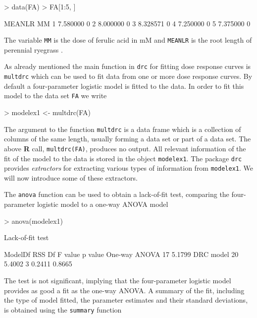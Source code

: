 \documentclass[a4paper]{article}
\begin{document}
\begin{Schunk}
\begin{Sinput}
> data(FA)
> FA[1:5, ]
\end{Sinput}
\begin{Soutput}
    MEANLR MM
1 7.580000  0
2 8.000000  0
3 8.328571  0
4 7.250000  0
5 7.375000  0
\end{Soutput}
\end{Schunk}
The variable \verb+MM+ is the dose of ferulic acid in mM and \verb+MEANLR+ is the root length of perennial ryegrass 
\citep{inderjit&streibig&olofsdotter:2002}.

As already mentioned the main function in \verb+drc+ for fitting dose response curves is \verb+multdrc+ which can be used to fit data from one or 
more dose response curves.
By default a four-parameter logistic model is fitted to the data. In order to fit this model to 
the data set \verb+FA+ we write 

\begin{Schunk}
\begin{Sinput}
> modelex1 <- multdrc(FA)
\end{Sinput}
\end{Schunk}
The argument to the function \verb+multdrc+ is a data frame 
which is a collection of columns of the same length, usually forming a data set or part of 
a data set. The above \textbf{R} call, \verb+multdrc(FA)+, produces no output. All relevant information of the fit of the model
to the data is stored in the object \verb+modelex1+. The package \verb+drc+ provides \emph{extractors} for extracting
various types of information from \verb+modelex1+. We will now introduce some of these extractors.

The \verb+anova+ function can be used to obtain a lack-of-fit test, comparing the four-parameter logistic model to a one-way ANOVA model

\begin{Schunk}
\begin{Sinput}
> anova(modelex1)
\end{Sinput}
\begin{Soutput}
Lack-of-fit test

              ModelDf    RSS Df F value p value
One-way ANOVA      17 5.1799                   
DRC model          20 5.4002  3  0.2411  0.8665
\end{Soutput}
\end{Schunk}
The test is not significant, implying that the four-parameter logistic model provides as good a fit as the one-way ANOVA.
A summary of the fit, including the type of model fitted, the parameter estimates and their
standard deviations, is obtained using the \verb+summary+ function
\end{document}

